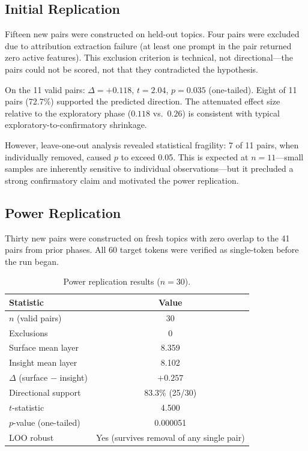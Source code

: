 \documentclass[10pt]{article}
\begin{document}
\subsection{Initial Replication}
\label{sec:initial_rep}

Fifteen new pairs were constructed on held-out topics. Four pairs were excluded due to attribution extraction failure (at least one prompt in the pair returned zero active features). This exclusion criterion is technical, not directional---the pairs could not be scored, not that they contradicted the hypothesis.

On the 11 valid pairs: $\Delta{=}+0.118$, $t{=}2.04$, $p{=}0.035$ (one-tailed). Eight of 11 pairs (72.7\%) supported the predicted direction. The attenuated effect size relative to the exploratory phase ($0.118$ vs.\ $0.26$) is consistent with typical exploratory-to-confirmatory shrinkage.

However, leave-one-out analysis revealed statistical fragility: 7 of 11 pairs, when individually removed, caused $p$ to exceed 0.05. This is expected at $n{=}11$---small samples are inherently sensitive to individual observations---but it precluded a strong confirmatory claim and motivated the power replication.

\subsection{Power Replication}
\label{sec:power_rep}

Thirty new pairs were constructed on fresh topics with zero overlap to the 41 pairs from prior phases. All 60 target tokens were verified as single-token before the run began.

\begin{table}[h]
\centering
\caption{Power replication results ($n{=}30$).}
\label{tab:power_rep}
\begin{tabular}{lc}
\toprule
\textbf{Statistic} & \textbf{Value} \\
\midrule
$n$ (valid pairs) & 30 \\
Exclusions & 0 \\
Surface mean layer & 8.359 \\
Insight mean layer & 8.102 \\
$\Delta$ (surface $-$ insight) & $+0.257$ \\
Directional support & 83.3\% (25/30) \\
$t$-statistic & 4.500 \\
$p$-value (one-tailed) & 0.000051 \\
LOO robust & Yes (survives removal of any single pair) \\
\bottomrule
\end{tabular}
\end{table}
\end{document}
